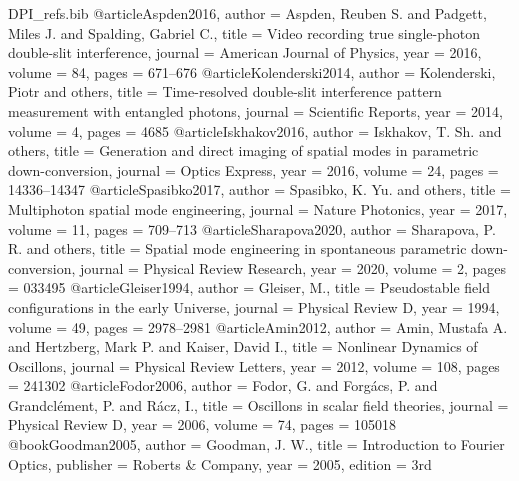 \RequirePackage{filecontents}
\begin{filecontents}{DPI_refs.bib}
@article{Aspden2016,
  author = {Aspden, Reuben S. and Padgett, Miles J. and Spalding, Gabriel C.},
  title = {Video recording true single-photon double-slit interference},
  journal = {American Journal of Physics},
  year = {2016},
  volume = {84},
  pages = {671--676}
}
@article{Kolenderski2014,
  author = {Kolenderski, Piotr and others},
  title = {Time-resolved double-slit interference pattern measurement with entangled photons},
  journal = {Scientific Reports},
  year = {2014},
  volume = {4},
  pages = {4685}
}
@article{Iskhakov2016,
  author = {Iskhakov, T. Sh. and others},
  title = {Generation and direct imaging of spatial modes in parametric down-conversion},
  journal = {Optics Express},
  year = {2016},
  volume = {24},
  pages = {14336--14347}
}
@article{Spasibko2017,
  author = {Spasibko, K. Yu. and others},
  title = {Multiphoton spatial mode engineering},
  journal = {Nature Photonics},
  year = {2017},
  volume = {11},
  pages = {709--713}
}
@article{Sharapova2020,
  author = {Sharapova, P. R. and others},
  title = {Spatial mode engineering in spontaneous parametric down-conversion},
  journal = {Physical Review Research},
  year = {2020},
  volume = {2},
  pages = {033495}
}
@article{Gleiser1994,
  author = {Gleiser, M.},
  title = {Pseudostable field configurations in the early Universe},
  journal = {Physical Review D},
  year = {1994},
  volume = {49},
  pages = {2978--2981}
}
@article{Amin2012,
  author = {Amin, Mustafa A. and Hertzberg, Mark P. and Kaiser, David I.},
  title = {Nonlinear Dynamics of Oscillons},
  journal = {Physical Review Letters},
  year = {2012},
  volume = {108},
  pages = {241302}
}
@article{Fodor2006,
  author = {Fodor, G. and Forg\'acs, P. and Grandcl\'ement, P. and R\'acz, I.},
  title = {Oscillons in scalar field theories},
  journal = {Physical Review D},
  year = {2006},
  volume = {74},
  pages = {105018}
}
@book{Goodman2005,
  author = {Goodman, J. W.},
  title = {Introduction to Fourier Optics},
  publisher = {Roberts \& Company},
  year = {2005},
  edition = {3rd}
}
\end{filecontents}

\documentclass[aps,pra,reprint,superscriptaddress,10pt]{revtex4-2}

\usepackage{amsmath,amssymb}
\usepackage{graphicx}
\usepackage{dcolumn}
\usepackage[colorlinks=true,linkcolor=blue,citecolor=blue,urlcolor=blue]{hyperref}
\usepackage{siunitx}
\usepackage{bm}

